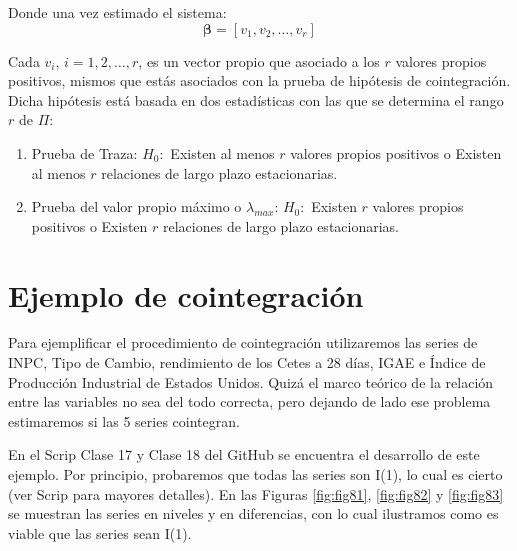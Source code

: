 \documentclass[
]{book}
\begin{document}
Donde una vez estimado el sistema:
\begin{equation}
    \boldsymbol{\beta} = [v_1, v_2, \ldots, v_r]
\end{equation}

Cada \(v_i\), \(i = 1, 2, \ldots, r\), es un vector propio que asociado a los \(r\) valores propios positivos, mismos que estás asociados con la prueba de hipótesis de cointegración. Dicha hipótesis está basada en dos estadísticas con las que se determina el rango \(r\) de \(\Pi\):

\begin{enumerate}
\def\labelenumi{\arabic{enumi}.}
\item
  Prueba de Traza:
  \(H_0 :\) Existen al menos \(r\) valores propios positivos o Existen al menos \(r\) relaciones de largo plazo estacionarias.
\item
  Prueba del valor propio máximo o \(\lambda_{max}\):
  \(H_0 :\) Existen \(r\) valores propios positivos o Existen \(r\) relaciones de largo plazo estacionarias.
\end{enumerate}

\hypertarget{ejemplo-de-cointegraciuxf3n}{%
\section{Ejemplo de cointegración}\label{ejemplo-de-cointegraciuxf3n}}

Para ejemplificar el procedimiento de cointegración utilizaremos las series de INPC, Tipo de Cambio, rendimiento de los Cetes a 28 días, IGAE e Índice de Producción Industrial de Estados Unidos. Quizá el marco teórico de la relación entre las variables no sea del todo correcta, pero dejando de lado ese problema estimaremos si las 5 series cointegran.

En el Scrip Clase 17 y Clase 18 del GitHub se encuentra el desarrollo de este ejemplo. Por principio, probaremos que todas las series son I(1), lo cual es cierto (ver Scrip para mayores detalles). En las Figuras \ref{fig:fig81}, \ref{fig:fig82} y \ref{fig:fig83} se muestran las series en niveles y en diferencias, con lo cual ilustramos como es viable que las series sean I(1).
\end{document}
